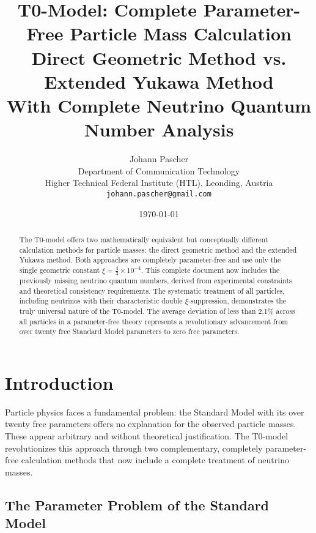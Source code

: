 \documentclass[12pt,a4paper]{article}
\newcommand{\xipar}{\xi}
\begin{document}
	
	\title{T0-Model: Complete Parameter-Free Particle Mass Calculation \\
		\large Direct Geometric Method vs. Extended Yukawa Method \\
		\large With Complete Neutrino Quantum Number Analysis}
	\author{Johann Pascher\\
		Department of Communication Technology\\
		Higher Technical Federal Institute (HTL), Leonding, Austria\\
		\texttt{johann.pascher@gmail.com}}
	\date{\today}
	
	\maketitle
	
	\begin{abstract}
		The T0-model offers two mathematically equivalent but conceptually different calculation methods for particle masses: the direct geometric method and the extended Yukawa method. Both approaches are completely parameter-free and use only the single geometric constant $\xipar = \frac{4}{3} \times 10^{-4}$. This complete document now includes the previously missing neutrino quantum numbers, derived from experimental constraints and theoretical consistency requirements. The systematic treatment of all particles, including neutrinos with their characteristic double $\xi$-suppression, demonstrates the truly universal nature of the T0-model. The average deviation of less than 2.1\% across all particles in a parameter-free theory represents a revolutionary advancement from over twenty free Standard Model parameters to zero free parameters.
	\end{abstract}
	
	\tableofcontents
	\newpage
	
	\section{Introduction}
	\label{sec:introduction}
	
	Particle physics faces a fundamental problem: the Standard Model with its over twenty free parameters offers no explanation for the observed particle masses. These appear arbitrary and without theoretical justification. The T0-model revolutionizes this approach through two complementary, completely parameter-free calculation methods that now include a complete treatment of neutrino masses.
	
	\subsection{The Parameter Problem of the Standard Model}
	\label{subsec:parameter_problem}
	
\end{document}
